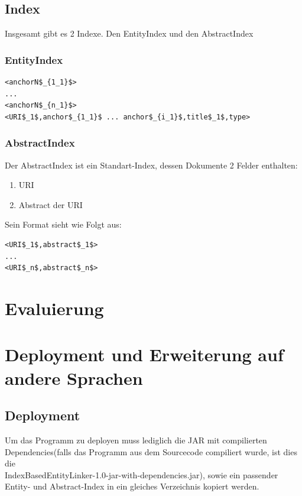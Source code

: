 \documentclass[11pt, a4paper, oneside]{Thesis} %
\begin{document}
\section{Index}
Insgesamt gibt es 2 Indexe. Den EntityIndex und den AbstractIndex
\subsection{EntityIndex}

\begin{lstlisting}
<anchorN$_{1_1}$>
...
<anchorN$_{n_1}$>
<URI$_1$,anchor$_{1_1}$ ... anchor$_{i_1}$,title$_1$,type>
\end{lstlisting}
\subsection{AbstractIndex}
Der AbstractIndex ist ein Standart-Index, dessen Dokumente 2 Felder enthalten:
\begin{enumerate}
\item URI
\item Abstract der URI
\end{enumerate}
Sein Format sieht wie Folgt aus:
\begin{lstlisting}
<URI$_1$,abstract$_1$>
...
<URI$_n$,abstract$_n$>
\end{lstlisting}
\chapter{Evaluierung}
\label{Kapitel 4}

\chapter{Deployment und Erweiterung auf andere Sprachen}
\label{Kapitel 5} %

\section{Deployment}
Um das Programm zu deployen muss lediglich die JAR mit compilierten Dependencies(falls das Programm aus dem Sourcecode compiliert wurde, ist dies die \\\glqq IndexBasedEntityLinker-1.0-jar-with-dependencies.jar\grqq), sowie ein passender Entity- und Abstract-Index in ein gleiches Verzeichnis kopiert werden.
\end{document}
